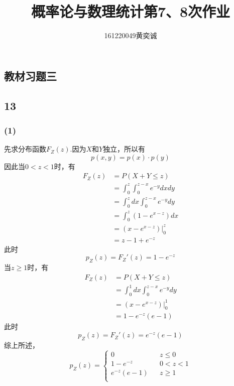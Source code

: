 \documentclass[twocolumn]{article}
\begin{document}
	\begin{CJK}{UTF8}{gbsn}		
			\title{概率论与数理统计第7、8次作业}
			\author{161220049\quad 黄奕诚}
			\maketitle
			
			\section*{教材习题三}
			\subsection*{13}
			\subsubsection*{(1)}
				先求分布函数$F_Z(z)$.因为$X$和$Y$独立，所以有\[p(x,y)=p(x)\cdot p(y)\]因此当$0<z<1$时，有\begin{align*}
					F_Z(z) & = P(X+Y\le z)\\
					& = \int_{0}^{z}\int_{0}^{z-x}e^{-y}dxdy\\
					& = \int_{0}^{z}dx\int_{0}^{z-x}e^{-y}dy\\
					& = \int_{0}^{z}(1-e^{x-z})dx\\
					& = (x-e^{x-z})|_0^z\\
					& = z-1+e^{-z}
				\end{align*}
				此时\[p_Z(z)=F_Z'(z)=1-e^{-z}\]当$z\ge1$时，有\begin{align*}
					F_Z(z) & = P(X+Y\le z)\\
					& = \int_{0}^{1}dx\int_{0}^{z-x}e^{-y}dy\\
					& = (x-e^{x-z})|_0^1\\
					& = 1-e^{-z}(e-1)
				\end{align*}
				此时\[p_Z(z)=F_Z'(z)=e^{-z}(e-1)\]综上所述，\begin{equation*}
				p_Z(z)=\left\{
				\begin{array}{rcl}
				0 & & {z\le0}\\
				1-e^{-z} & & {0<z<1}\\
				e^{-z}(e-1) & & {z\ge1}\\
				\end{array} \right.
				\end{equation*}

\end{CJK}
\end{document}
